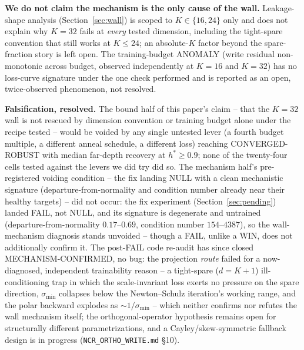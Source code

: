 \textbf{We do not claim the mechanism is the only cause of the wall.}
Leakage-shape analysis (Section~\ref{sec:wall}) is scoped to $K \in
\{16, 24\}$ only and does not explain why $K{=}32$ fails at
\emph{every} tested dimension, including the tight-spare convention that
still works at $K \leq 24$; an absolute-$K$ factor beyond the
spare-fraction story is left open. The training-budget ANOMALY (write
residual non-monotonic across budget, observed independently at $K{=}16$
and $K{=}32$) has no loss-curve signature under the one check performed
and is reported as an open, twice-observed phenomenon, not resolved.

\textbf{Falsification, resolved.} The bound half of this paper's claim --
that the $K{=}32$ wall is not rescued by dimension convention or training
budget alone under the recipe tested -- would be voided by any single
untested lever (a fourth budget multiple, a different anneal schedule, a
different loss) reaching CONVERGED-ROBUST with median far-depth recovery
at $h^\ast \geq 0.9$; none of the twenty-four cells tested against the
levers we did try did so. The mechanism half's pre-registered voiding
condition -- the fix landing NULL with a clean mechanistic signature
(departure-from-normality and condition number already near their healthy
targets) -- did not occur: the fix experiment
(Section~\ref{sec:pending}) landed FAIL, not NULL, and its signature is
degenerate and untrained (departure-from-normality $0.17$--$0.69$,
condition number $154$--$4387$), so the wall-mechanism diagnosis stands
unvoided -- though a FAIL, unlike a WIN, does not additionally confirm
it. The post-FAIL code re-audit has since closed MECHANISM-CONFIRMED, no
bug: the projection \emph{route} failed for a now-diagnosed, independent
trainability reason -- a tight-spare ($d{=}K{+}1$) ill-conditioning trap
in which the scale-invariant loss exerts no pressure on the spare
direction, $\sigma_{\min}$ collapses below the Newton--Schulz iteration's
working range, and the polar backward explodes as $\sim 1/\sigma_{\min}$
-- which neither confirms nor refutes the wall mechanism itself; the
orthogonal-operator hypothesis remains open for structurally different
parametrizations, and a Cayley/skew-symmetric fallback design is in
progress (\texttt{NCR\_ORTHO\_WRITE.md} \S10).
